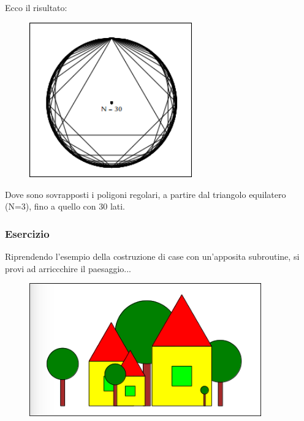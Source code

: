 \vskip 1cm

Ecco il risultato:

\vskip 0.5cm

\begin{figure}[H]
   \includegraphics[width=7.0cm,trim=4 4 8 4,clip]{./images/incapsulare/incapsulare-5.png}
   \label{inc-6}
\end{figure}

\vskip 0.5cm

Dove sono sovrapposti i poligoni regolari, a partire dal triangolo equilatero (N=3), fino a quello con 30 lati. 

\subsubsection{Esercizio}

Riprendendo l'esempio della costruzione di case con un'apposita subroutine, si provi ad arriccchire il paesaggio...

\vskip 0.5cm

\begin{figure}[H]
   \includegraphics[width=10.0cm,trim=4 4 8 4,clip]{./images/incapsulare/incapsulare-6.png}
   \label{inc-7}
\end{figure}

\vskip 0.5cm


